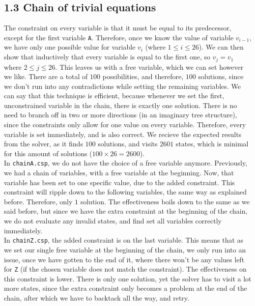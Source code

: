 \documentclass{article}
\begin{document}
\subsection*{1.3 \hspace*{0.3cm} Chain of trivial equations}
The constraint on every variable is that it must be equal to its predecessor, except for the first variable \verb|A|. Therefore, once we know the value of variable $v_{i-1}$, we have only one possible value for variable $v_i$ (where $1 \leq i \leq 26$). We can then show that inductively that every variable is equal to the first one, so $v_j = v_1$ where $2\leq j \leq 26$. This leaves us with a free variable, which we can set however we like. There are a total of $100$ possibilities, and therefore, $100$ solutions, since we don't run into any contradictions while setting the remaining variables. We can say that this technique is efficient, because whenever we set the first, unconstrained variable in the chain, there is exactly one solution. There is no need to branch off in two or more directions (in an imaginary tree structure), since the constraints only allow for one value on every variable. Therefore, every variable is set immediately, and is also correct. We recieve the expected results from the solver, as it finds $100$ solutions, and visits $2601$ states, which is minimal for this amount of solutions ($100\times 26=2600$).\\
In \verb|chainA.csp|, we do not have the choice of a free variable anymore. Previously, we had a chain of variables, with a free variable at the beginning. Now, that variable has been set to one specific value, due to the added constraint. This constraint will ripple down to the following variables, the same way as explained before. Therefore, only $1$ solution. The effectiveness boils down to the same as we said before, but since we have the extra constraint at the beginning of the chain, we do not evaluate any invalid states, and find set all variables correctly immediately.\\
In \verb|chainZ.csp|, the added constraint is on the last variable. This means that as we set our single free variable at the beginning of the chain, we only run into an issue, once we have gotten to the end of it, where there won't be any values left for \verb|Z| (if the chosen variable does not match the constraint). The effectiveness on this constraint is lower. There is only one solution, yet the solver has to visit a lot more states, since the extra constraint only becomes a problem at the end of the chain, after which we have to backtack all the way, and retry.\\
\end{document}
